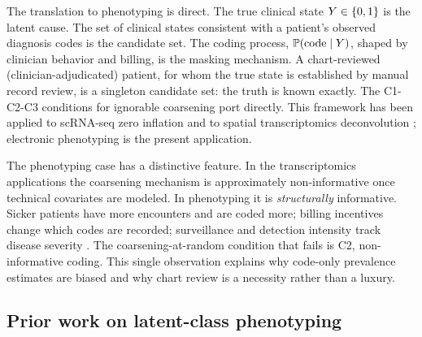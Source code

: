 The translation to phenotyping is direct. The true clinical state
$Y \in \{0,1\}$ is the latent cause. The set of clinical states
consistent with a patient's observed diagnosis codes is the candidate
set. The coding process, $\mathbb{P}(\text{code} \mid Y)$, shaped by
clinician behavior and billing, is the masking mechanism. A
chart-reviewed (clinician-adjudicated) patient, for whom the true
state is established by manual record review, is a singleton candidate
set: the truth is known exactly. The C1-C2-C3 conditions for ignorable
coarsening port directly. This framework has been applied to scRNA-seq
zero inflation \citep{towell2026scrnacoarsening} and to spatial
transcriptomics deconvolution \citep{towell2026spatialcoarsening};
electronic phenotyping is the present application.

The phenotyping case has a distinctive feature. In the transcriptomics
applications the coarsening mechanism is approximately non-informative
once technical covariates are modeled. In phenotyping it is
\emph{structurally} informative. Sicker patients have more encounters
and are coded more; billing incentives change which codes are recorded;
surveillance and detection intensity track disease severity
\citep{haut2011surveillance}. The coarsening-at-random condition that
fails is C2, non-informative coding. This single observation explains
why code-only prevalence estimates are biased and why chart review is
a necessity rather than a luxury.

\subsection{Prior work on latent-class phenotyping}

